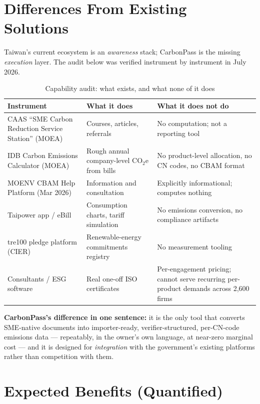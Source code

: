 \section{Differences From Existing Solutions}\label{sec:diff}

Taiwan's current ecosystem is an \emph{awareness} stack; CarbonPass is the
missing \emph{execution} layer. The audit below was verified instrument by
instrument in July 2026.

\begin{table}[htbp]
\caption{Capability audit: what exists, and what none of it does}
\label{tab:gap}
\small
\begin{tabularx}{\textwidth}{@{}p{}p{}X@{}}
\toprule
\textbf{Instrument} & \textbf{What it does} & \textbf{What it does not do} \\
\midrule
CAAS ``SME Carbon Reduction Service Station'' (MOEA)\cite{caas} & Courses, articles, referrals & No computation; not a reporting tool \\
IDB Carbon Emissions Calculator (MOEA)\cite{idb} & Rough annual company-level CO$_2$e from bills & No product-level allocation, no CN codes, no CBAM format \\
MOENV CBAM Help Platform (Mar 2026)\cite{tpt-cbam} & Information and consultation & Explicitly informational; computes nothing \\
Taipower app / eBill\cite{taipower} & Consumption charts, tariff simulation & No emissions conversion, no compliance artifacts \\
tre100 pledge platform (CIER)\cite{tre100} & Renewable-energy commitments registry & No measurement tooling \\
Consultants / ESG software\cite{chanchin} & Real one-off ISO certificates & Per-engagement pricing; cannot serve recurring per-product demands across 2,600 firms \\
\bottomrule
\end{tabularx}
\end{table}

\textbf{CarbonPass's difference in one sentence:} it is the only tool that
converts SME-native documents into importer-ready, verifier-structured,
per-CN-code emissions data --- repeatably, in the owner's own language, at
near-zero marginal cost --- and it is designed for \emph{integration} with the
government's existing platforms rather than competition with them.

\section{Expected Benefits (Quantified)}\label{sec:benefits}

